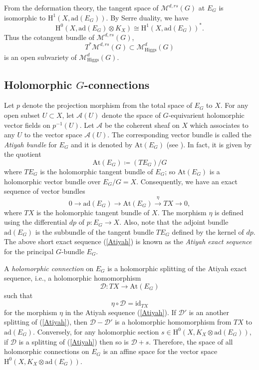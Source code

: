 \documentclass[11pt, reqno]{amsart}
\numberwithin{equation}{section}
\theoremstyle{definition}
\begin{document}
From the deformation theory, the tangent space of $\mathcal{M}^{d,rs}(G)$ at $E_G$ is isomorphic to $\mathrm{H}^1(X, \mathrm{ad}(E_G))$. By Serre duality, we have
\[
\mathrm{H}^0(X, \mathrm{ad}(E_G) \otimes K_X) \cong \mathrm{H}^1(X, \mathrm{ad}(E_G))^*.
\]
Thus the cotangent bundle of $\mathcal{M}^{d,rs}(G)$, $$T^*\mathcal{M}^{d,rs}(G) \subset \mathcal{M}^{d}_{\mathrm{Higgs}}(G)$$ is an open subvariety of $\mathcal{M}^{d}_{\mathrm{Higgs}}(G)$.
	
\subsection{Holomorphic $G$-connections}
 Let $p$ denote the projection morphism from the total space of $E_G$ to $X$. For any open subset $U \subset X$, let $\mathcal{A}(U)$ denote the space of $G$-equivarient holomorphic vector fields on $p^{-1}(U)$. Let $\mathcal{A}$ be the coherent sheaf on $X$ which associates to any $U$ to the vector space $\mathcal{A}(U)$. The corresponding vector bundle is called the \textit{Atiyah bundle} for $E_G$ and it is denoted by $\mathrm{At}(E_G)$ (see \cite{A57}). In fact, it is given by the quotient
 \[
 \mathrm{At}(E_G) \coloneqq (TE_G)/G
 \]
 where $TE_G$ is the holomorphic tangent bundle of $E_G$; so $\mathrm{At}(E_G)$ is a holomorphic vector bundle over $E_G/G = X$. Consequently, we have an exact sequence of vector bundles
	\begin{equation}\label{Atiyah}
	0 \longrightarrow \mathrm{ad}(E_G) \longrightarrow \mathrm{At}(E_G) \overset{\eta}\longrightarrow TX \longrightarrow 0,
	\end{equation}
	where $TX$ is the holomorphic tangent bundle of $X$. The morphism $\eta$ is defined using the differential $dp$ of $p: E_G \to X$. Also, note that the adjoint bundle $\mathrm{ad}(E_G)$ is the subbundle of the tangent bundle $TE_G$ defined by the kernel of $dp$. The above short exact sequence (\ref{Atiyah}) is known as the \textit{Atiyah exact sequence} for the principal $G$-bundle $E_G$.
	
	A \textit{holomorphic connection} on $E_G$ is a holomorphic splitting of the Atiyah exact sequence, i.e., a holomorphic homomorphism
	\[
	\mathcal{D} : TX \longrightarrow \mathrm{At}(E_G)
	\]
	such that $$\eta \circ \mathcal{D} = \mathrm{id}_{TX}$$ for the morphism $\eta$ in the Atiyah sequence (\ref{Atiyah}). If $\mathcal{D}'$ is an another splitting of (\ref{Atiyah}), then $\mathcal{D}-\mathcal{D}'$ is a holomorphic homomorphism from $TX$ to $\mathrm{ad}(E_G)$. Conversely, for any holomorphic section $s \in \mathrm{H}^0(X, K_X \otimes \mathrm{ad}(E_G))$, if $\mathcal{D}$ is a splitting of (\ref{Atiyah}) then so is $\mathcal{D}+s$. Therefore, the space of all holomorphic connections on $E_G$ is an affine space for the vector space $\mathrm{H}^0(X, K_X \otimes \mathrm{ad}(E_G))$. 
	
\end{document}
